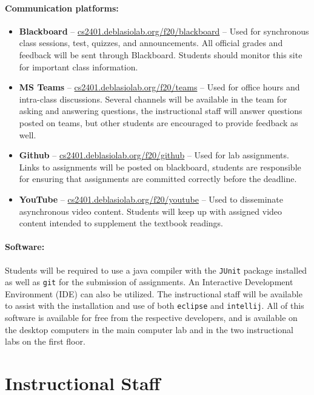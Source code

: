\documentclass[12pt]{scrartcl}
\newcommand{\change}[2]{#2}
\begin{document}
\paragraph{Communication platforms:}
\change{}{\begin{itemize}
\item \textbf{Blackboard} -- \url{cs2401.deblasiolab.org/f20/blackboard}  -- Used for synchronous class sessions, test, quizzes, and announcements. All official grades and feedback will be sent through Blackboard. Students should monitor this site for important class information. 
\item \textbf{MS Teams} -- \url{cs2401.deblasiolab.org/f20/teams}  -- Used for office hours and intra-class discussions. Several channels will be available in the team for asking and answering questions, the instructional staff will answer questions posted on teams, but other students are encouraged to provide feedback as well. 
\item \textbf{Github} -- \url{cs2401.deblasiolab.org/f20/github}  -- Used for lab assignments. Links to assignments will be posted on blackboard, students are responsible for ensuring that assignments are committed correctly before the deadline. 
\item \textbf{YouTube} -- \url{cs2401.deblasiolab.org/f20/youtube} -- Used to disseminate asynchronous video content. Students will keep up with assigned video content intended to supplement the textbook readings.
\end{itemize}}

\paragraph{Software: } 
\change{}{Students will be required to use a java compiler with the \texttt{JUnit} package installed as well as \texttt{git} for the submission of assignments. 
An Interactive Development Environment (IDE) can also be utilized. The instructional staff will be available to assist with the installation and use of both \texttt{eclipse} and \texttt{intellij}. 
All of this software is available for free from the respective developers, and is } available on the desktop computers in the main computer lab and in the two instructional labs on the first floor. 

\section{Instructional Staff}
\end{document}
